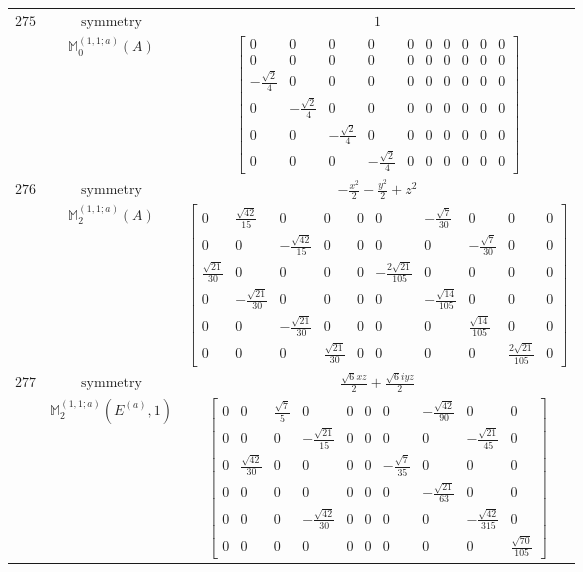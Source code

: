 \documentclass[fleqn,8pt,landscape]{jsarticle}
\begin{document}
\begin{longtable}{ccc}
$ 275 $ & $ \text{symmetry} $ & $ 1 $ \\
$  $ & $ \mathbb{M}_{0}^{(1,1;a)}(A) $ & $ \begin{bmatrix} 0 & 0 & 0 & 0 & 0 & 0 & 0 & 0 & 0 & 0 \\ 0 & 0 & 0 & 0 & 0 & 0 & 0 & 0 & 0 & 0 \\ - \frac{\sqrt{2}}{4} & 0 & 0 & 0 & 0 & 0 & 0 & 0 & 0 & 0 \\ 0 & - \frac{\sqrt{2}}{4} & 0 & 0 & 0 & 0 & 0 & 0 & 0 & 0 \\ 0 & 0 & - \frac{\sqrt{2}}{4} & 0 & 0 & 0 & 0 & 0 & 0 & 0 \\ 0 & 0 & 0 & - \frac{\sqrt{2}}{4} & 0 & 0 & 0 & 0 & 0 & 0 \end{bmatrix} $ \\ \hline
$ 276 $ & $ \text{symmetry} $ & $ - \frac{x^{2}}{2} - \frac{y^{2}}{2} + z^{2} $ \\
$  $ & $ \mathbb{M}_{2}^{(1,1;a)}(A) $ & $ \begin{bmatrix} 0 & \frac{\sqrt{42}}{15} & 0 & 0 & 0 & 0 & - \frac{\sqrt{7}}{30} & 0 & 0 & 0 \\ 0 & 0 & - \frac{\sqrt{42}}{15} & 0 & 0 & 0 & 0 & - \frac{\sqrt{7}}{30} & 0 & 0 \\ \frac{\sqrt{21}}{30} & 0 & 0 & 0 & 0 & - \frac{2 \sqrt{21}}{105} & 0 & 0 & 0 & 0 \\ 0 & - \frac{\sqrt{21}}{30} & 0 & 0 & 0 & 0 & - \frac{\sqrt{14}}{105} & 0 & 0 & 0 \\ 0 & 0 & - \frac{\sqrt{21}}{30} & 0 & 0 & 0 & 0 & \frac{\sqrt{14}}{105} & 0 & 0 \\ 0 & 0 & 0 & \frac{\sqrt{21}}{30} & 0 & 0 & 0 & 0 & \frac{2 \sqrt{21}}{105} & 0 \end{bmatrix} $ \\ \hline
$ 277 $ & $ \text{symmetry} $ & $ \frac{\sqrt{6} x z}{2} + \frac{\sqrt{6} i y z}{2} $ \\
$  $ & $ \mathbb{M}_{2}^{(1,1;a)}(E^{(a)},1) $ & $ \begin{bmatrix} 0 & 0 & \frac{\sqrt{7}}{5} & 0 & 0 & 0 & 0 & - \frac{\sqrt{42}}{90} & 0 & 0 \\ 0 & 0 & 0 & - \frac{\sqrt{21}}{15} & 0 & 0 & 0 & 0 & - \frac{\sqrt{21}}{45} & 0 \\ 0 & \frac{\sqrt{42}}{30} & 0 & 0 & 0 & 0 & - \frac{\sqrt{7}}{35} & 0 & 0 & 0 \\ 0 & 0 & 0 & 0 & 0 & 0 & 0 & - \frac{\sqrt{21}}{63} & 0 & 0 \\ 0 & 0 & 0 & - \frac{\sqrt{42}}{30} & 0 & 0 & 0 & 0 & - \frac{\sqrt{42}}{315} & 0 \\ 0 & 0 & 0 & 0 & 0 & 0 & 0 & 0 & 0 & \frac{\sqrt{70}}{105} \end{bmatrix} $ \\ \hline

\end{longtable}
\end{document}
